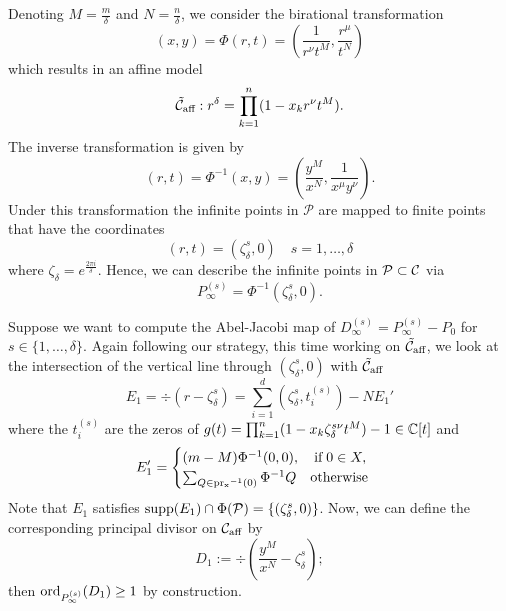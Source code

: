 \documentclass[main.tex]{subfiles}
\begin{document}
  Denoting $M = \frac{m}\delta$ and $N = \frac{n}\delta$, we consider the birational transformation
  \begin{equation*}
   (x,y) = \Phi(r,t) = \left(\frac{1}{r^{\nu}t^M},\frac{r^{\mu}}{t^N}\right)
  \end{equation*}
  which results in an affine model
  \begin{equation*}
   \tilde{\mathcal{C}}_{\text{aff}} : r^{\delta} = \prod_{k=1}^n (1-x_kr^{\nu}t^M).
  \end{equation*}
  The inverse transformation is given by
  \begin{equation*}
   (r,t) = \Phi^{-1}(x,y) = \left(\frac{y^M}{x^N},\frac{1}{x^{\mu}y^{\nu}}\right).
  \end{equation*}
  Under this transformation the infinite points in $\mathcal{P}$ are mapped to finite points that have the coordinates
  \begin{equation*}
   (r,t) = (\zeta_{\delta}^s,0) \quad s= 1,\dots,\delta
  \end{equation*}
  where $\zeta_{\delta} = e^{\frac{2\pi i }{\delta}}$.
  Hence, we can describe the infinite points in $\mathcal{P} \subset \mathcal{C}$ via
   \begin{equation*}
      P_{\infty}^{(s)} = \Phi^{-1}(\zeta_{\delta}^s,0).
   \end{equation*}


   Suppose we want to compute the Abel-Jacobi map of $D_{\infty}^{(s)} = P_{\infty}^{(s)} - P_0$ for $s \in \{1,\dots,\delta\}$.
   Again following our strategy,
   this time working on $\tilde{\mathcal{C}}_{\text{aff}}$, we look at the intersection of the vertical line through $(\zeta_{\delta}^s,0)$ with
   $\tilde{\mathcal{C}}_{\text{aff}}$
   \begin{equation*}
      E_1 = \div(r - \zeta_{\delta}^s) = \sum_{i = 1}^{d} \left(\zeta_{\delta}^s,t_i^{(s)}\right) - N E_1'
   \end{equation*}
      where the $t_i^{(s)}$ are the zeros of $g(t) = \prod_{k=1}^n (1-x_k\zeta_{\delta}^{s\nu}t^M) - 1 \in \mathbb{C}[t]$ and
    \begin{equation}\label{eq:zero_bp1}
       E_1' = \begin{cases}
	     (m-M) \Phi^{-1}(0,0), \quad \text{if} \; 0 \in X, \\
             \sum_{Q \in \operatorname{pr_x}^{-1}(0)} \Phi^{-1}Q \quad \text{otherwise}
            \end{cases}
    \end{equation}
    Note that $E_1$ satisfies $\operatorname{supp}(E_1) \cap \Phi(\mathcal{P}) = \{ (\zeta_{\delta}^s,0) \}$.
    Now, we can define the corresponding principal divisor on $\mathcal{C}_{\text{aff}}$ by
    \begin{equation*}
       D_1 := \div \left( \frac{y^M}{x^N} - \zeta_{\delta}^s \right);
    \end{equation*}
   then $\operatorname{ord}_{P_{\infty}^{(s)}}(D_1) \ge 1$ by construction.
\end{document}
